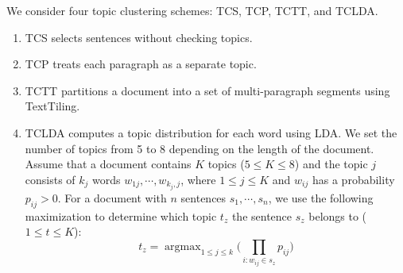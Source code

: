 \documentclass[a4paper,twoside]{article}
\DeclareMathOperator*{\argmax}{argmax}
\begin{document}
We consider four topic clustering schemes: TCS, TCP, TCTT, and TCLDA.
\begin{enumerate}
\item TCS %
selects sentences without checking topics.
\item TCP %
treats each paragraph as a separate topic.
\item TCTT %
partitions a document into a set of multi-paragraph %
segments using TextTiling.
\item TCLDA %
computes a topic distribution for each word using LDA. %
We set the number of topics from 5 to 8 depending on the length of the document.
Assume that a document contains $K$ topics ($5 \leq K \leq 8$) and the topic $j$ consists of $k_j$ words $w_{1j}, \cdots, w_{k_j,j}$, where $1 \leq j \leq K$
and
$w_{ij}$ has a probability $p_{ij} > 0$. For a document with $n$ sentences $s_1, \cdots, s_n$,
we use the following maximization to determine which topic $t_z$ the sentence $s_z$ belongs to ($1 \leq t \leq K$):
\begin{equation} \label{eq4}
t_z = \argmax_{1 \leq j\leq k}\bigg(\prod_{i:w_{ij} \in s_z} {p_{ij}}\bigg)
\end{equation}
\end{enumerate}
\end{document}
